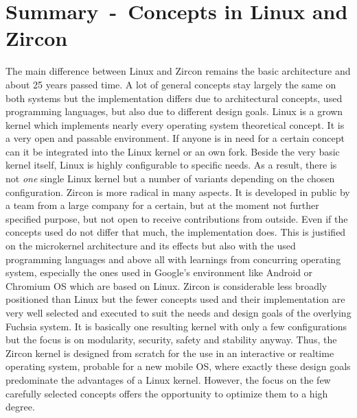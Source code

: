 \section{Summary~-~Concepts in Linux and Zircon}
The main difference between Linux and Zircon remains the basic architecture and about 25 years passed time.
A lot of general concepts stay largely the same on both systems but the implementation differs due to architectural concepts, used programming languages, but also due to different design goals.
Linux is a grown kernel which implements nearly every operating system theoretical concept.
It is a very open and passable environment.
If anyone is in need for a certain concept can it be integrated into the Linux kernel or an own fork.
Beside the very basic kernel itself, Linux is highly configurable to specific needs.
As a result, there is not \textit{one} single Linux kernel but a number of variants depending on the chosen configuration.
Zircon is more radical in many aspects.
It is developed in public by a team from a large company for a certain, but at the moment not further specified purpose, but not open to receive contributions from outside.
Even if the concepts used do not differ that much, the implementation does.
This is justified on the microkernel architecture and its effects but also with the used programming languages and above all with learnings from concurring operating system, especially the ones used in Google's environment like Android or Chromium OS which are based on Linux.
Zircon is considerable less broadly positioned than Linux but the fewer concepts used and their implementation are very well selected and executed to suit the needs and design goals of the overlying Fuchsia system. 
It is basically one resulting kernel with only a few configurations but the focus is on modularity, security, safety and stability anyway\cite{chat-zircon-arch}.
Thus, the Zircon kernel is designed from scratch for the use in an interactive or realtime operating system, probable for a new mobile OS, where exactly these design goals predominate the advantages of a Linux kernel. 
However, the focus on the few carefully selected concepts offers the opportunity to optimize them to a high degree.



